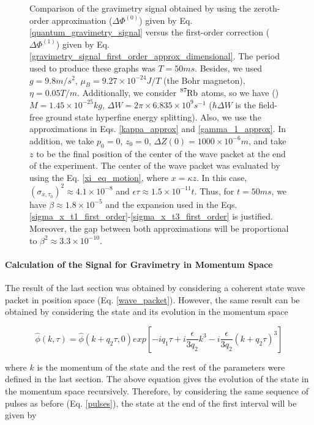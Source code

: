 \documentclass{article}
\begin{document}
\begin{figure}
     \caption{Comparison of the gravimetry signal obtained by using the zeroth-order approximation ($\Delta \Phi ^{(0)}$) given by Eq. \ref{quantum_gravimetry_signal} versus the first-order correction ($\Delta \Phi ^{(1)}$) given by Eq. \ref{gravimetry_signal_first_order_approx_dimensional}. The period used to produce these graphs was $T=50ms$. Besides, we used $g=9.8m/s^{2}$, $\mu_{B}=9.27\times10^{-24} J/T$ (the Bohr magneton), $\eta=0.05 T/m$. Additionally, we consider $\ce{^{87}_{}Rb}$ atoms, so we have (\cite{Bunge1993}\cite{KAUSHALSK1970}) $M=1.45\times10^{-25}kg$, $\Delta W=2\pi\times6.835\times10^{9}s^{-1}$ ($\hbar \Delta W $ is the field-free ground state hyperfine energy splitting). Also, we use the approximations in Eqs. \ref{kappa_approx} and \ref{gamma_1_approx}. In addition, we take $p_{0}=0$, $z_{0}=0$, $\Delta Z(0)=1000\times10^{-6}m$, and take $z$ to be the final position of the center of the wave packet at the end of the experiment. The center of the wave packet was evaluated by using the Eq. \ref{xi_eq_motion}, where $x=\kappa z$. In this case, $(\sigma_{x, \tau_{0}})^{2} \approx 4.1 \times 10^{-8}$ and $\epsilon \tau \approx 1.5 \times 10^{-11} t$. Thus, for $t=50ms$, we have $\beta \approx 1.8 \times 10^{-5}$ and the expansion used in the Eqs. \ref{sigma_x_t1_first_order}-\ref{sigma_x_t3_first_order} is justified. Moreover, the gap between both approximations will be proportional to $\beta ^2 \approx 3.3 \times 10^{-10}$.}
     \label{phase_graph_first_order}
\end{figure}


\paragraph{Calculation of the Signal for Gravimetry in Momentum Space}
The result of the last section was obtained by considering a coherent state wave packet in position space (Eq. \ref{wave_packet}). However, the same result can be obtained by considering the state and its evolution in the momentum space \cite{Castanos2014}

\begin{equation}
\widehat{\phi}(k, \tau) = \widehat{\phi}(k + q_{2}\tau, 0) exp\left[-i q_{1} \tau + i \frac{\epsilon}{3q_{2}} k^{3} - i \frac{\epsilon}{3q_{2}} (k + q_{2} \tau)^{3} \right]
\end{equation}

where $k$ is the momentum of the state and the rest of the parameters were defined in the last section. The above equation gives the evolution of the state in the momentum space recursively. Therefore, by considering the same sequence of pulses as before (Eq. \ref{pulses}), the state at the end of the first interval will be given by
\end{document}
